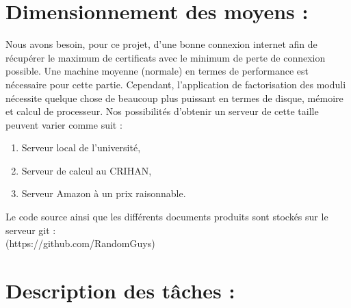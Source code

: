 \documentclass[a4paper,11pt,french]{article}
\begin{document}
\section{Dimensionnement des moyens :}

Nous avons besoin, pour ce projet, d'une bonne connexion internet afin de récupérer le maximum de certificats avec le minimum de perte de connexion possible. Une machine moyenne (normale) en termes de performance est nécessaire pour cette partie. Cependant, l'application de factorisation des moduli nécessite quelque chose de beaucoup plus puissant en termes de disque, mémoire et calcul de processeur. Nos possibilités d'obtenir un serveur de cette taille peuvent varier comme suit :
\begin{enumerate}
\item Serveur local de l'université,
\item Serveur de calcul au CRIHAN,
\item Serveur Amazon à un prix raisonnable.
\end{enumerate}

Le code source ainsi que les différents documents produits sont stockés sur le serveur git : \\ (https://github.com/RandomGuys)

\newpage

\section{Description des tâches :}
\end{document}

